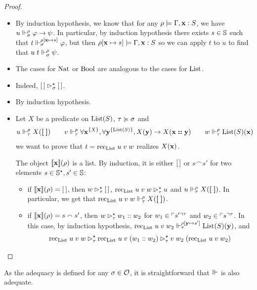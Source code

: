 \documentclass[a4paper,UKenglish,cleveref, autoref, thm-restate]{lipics-v2021}
\begin{document}
\begin{proof}
\begin{itemize}
  \item {} By induction hypothesis, we know that for any $\rho\models \Gamma, \mathbf{x} : S$, we have $u \Vdash_{\sigma}^{\rho} \varphi \to \psi$. In particular, by induction hypothesis there exists $s \in \mathbb S$ such that $t \Vdash_{\sigma}^{\rho[\mathbf{x} \mapsto s]} \varphi$, but then $\rho[\mathbf{x}\mapsto s]\models \Gamma, \mathbf{x} : S$ so we can apply $t$ to $u$ to find that $u\;t\Vdash_{\sigma}^{\rho} \psi$.
  \item The cases for $\mathrm{Nat}$ or $\mathrm{Bool}$ are analogous to the cases for $\mathrm{List}$.
  \item {} Indeed, $[\,] \rhd^{\star}_{\sigma} [\,]$.
  \item {} By induction hypothesis.
  \item {} Let $X$ be a predicate on $\mathrm{List}(S)$, $\tau \succcurlyeq\sigma$ and
    \[
    u \Vdash_{\tau}^{\rho} X(\boldsymbol[ \; \boldsymbol])\qquad
    v \Vdash_{\tau}^{\rho} \forall \mathbf{x}^{\{X\}}, \forall \mathbf{y}^{\{\mathrm{List}(S)\}}, X(\mathbf{y}) \to X(\mathbf{x} \boldsymbol{::} \mathbf{y})\qquad
    w \Vdash_{\tau}^{\rho} \mathrm{List}(S)(\mathbf{x})
    \]
    we want to prove that $t = \mathrm{rec}_{\mathrm{List}}\;u\;v\;w$ realizes $X(\mathbf{x})$.

    The object $\llbracket \mathbf{x} \rrbracket(\rho)$ is a list. By induction, it is either $[\,]$ or $s \smallfrown s'$ for two elements $s \in \mathbb S^\star, s' \in \mathbb S$:
    \begin{itemize}
    \item if $\llbracket \mathbf{x} \rrbracket(\rho) = [\,]$, then $w \rhd^{\star}_{\tau} [\,]$, $\mathrm{rec}_{\mathrm{List}}\;u\;v\;w \rhd^{\star}_{\tau} u$ and $u \Vdash_{\tau}^{\rho} X(\boldsymbol[ \; \boldsymbol])$. In particular, we get that $\mathrm{rec}_{\mathrm{List}}\;u\;v\;w\Vdash_{\tau}^{\rho} X(\boldsymbol[ \; \boldsymbol])$.
    \item if $\llbracket \mathbf{x} \rrbracket(\rho) = s \smallfrown s'$, then $w \rhd^{\star}_{\tau} w_1:: w_2$ for $w_1 \in \ulcorner s'\urcorner^{\tau}$ and $w_2\in\ulcorner s\urcorner^{\tau}$. In this case, by induction hypothesis, $\mathrm{rec}_{\mathrm{List}}\;u\;v\;w_2 \Vdash_{\tau}^{\rho[\mathbf{y} \mapsto s']} \mathrm{List}(S)(\mathbf{y})$, and
      \[\mathrm{rec}_{\mathrm{List}}\;u\;v\;w \rhd^{\star}_{\tau} \mathrm{rec}_{\mathrm{List}}\;u\;v\;(w_1:: w_2) \rhd^{\star}_{\tau} v\;w_2\;(\mathrm{rec}_{\mathrm{List}}\;u\;v\;w_2)\qedhere\]
      
    \end{itemize}
  \end{itemize}
 \end{proof}

As the adequacy is defined for any $\sigma\in\mathcal O$, it is straightforward that $\Vvdash$ is also adequate.
\end{document}
